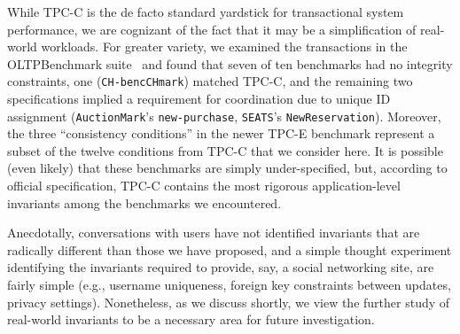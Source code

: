  While TPC-C is the de facto
standard yardstick for transactional system performance, we are
cognizant of the fact that it may be a simplification of real-world
workloads. For greater variety, we examined the transactions in the
OLTPBenchmark suite~\cite{oltpbench} and found that seven of ten
benchmarks had no integrity constraints, one (\texttt{CH-bencCHmark})
matched TPC-C, and the remaining two specifications implied a
requirement for coordination due to unique ID assignment
(\texttt{AuctionMark}'s \texttt{new-purchase}, \texttt{SEATS}'s
\texttt{NewReservation}). Moreover, the three ``consistency
conditions'' in the newer TPC-E benchmark represent a subset of the
twelve conditions from TPC-C that we consider here. It is possible
(even likely) that these benchmarks are simply under-specified, but,
according to official specification, TPC-C contains the most rigorous
application-level invariants among the benchmarks we encountered.

Anecdotally, conversations with users have not identified invariants
that are radically different than those we have proposed, and a simple
thought experiment identifying the invariants required to provide,
say, a social networking site, are fairly simple (e.g., username
uniqueness, foreign key constraints between updates, privacy
settings). Nonetheless, as we discuss shortly, we view the further
study of real-world invariants to be a necessary area for future
investigation.


